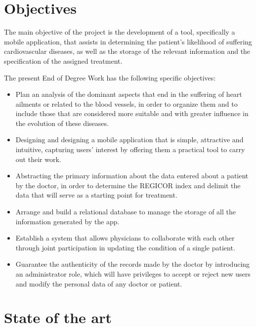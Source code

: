 \documentclass[11pt,spanish,
		listoftables,listoffigures]
		{tfgplantilla}
\begin{document}
\section{Objectives}

The main objective of the project is the development of a tool, specifically a mobile application, that assists in determining the patient's likelihood of suffering cardiovascular diseases, as well as the storage of the relevant information and the specification of the assigned treatment.

The present End of Degree Work has the following specific objectives:

\begin{itemize}
    \item Plan an analysis of the dominant aspects that end in the suffering of heart ailments or related to the blood vessels, in order to organize them and to include those that are considered more suitable and with greater influence in the evolution of these diseases.

    \item Designing and designing a mobile application that is simple, attractive and intuitive, capturing users' interest by offering them a practical tool to carry out their work.
    
    \item Abstracting the primary information about the data entered about a patient by the doctor, in order to determine the REGICOR index and delimit the data that will serve as a starting point for treatment.
    
    \item Arrange and build a relational database to manage the storage of all the information generated by the app. 
    
    \item Establish a system that allows physicians to collaborate with each other through joint participation in updating the condition of a single patient.
    
    \item Guarantee the authenticity of the records made by the doctor by introducing an administrator role, which will have privileges to accept or reject new users and modify the personal data of any doctor or patient. 
\end{itemize}

\section{State of the art}
\end{document}
